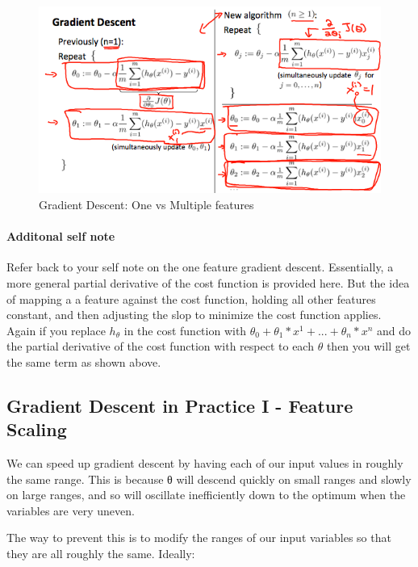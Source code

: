 \documentclass[
]{article}
\begin{document}
\begin{figure}
\centering
\includegraphics{Gradient Descent for Multiple Variables graph 1.png}
\caption{Gradient Descent: One vs Multiple features}
\end{figure}

\hypertarget{additonal-self-note-1}{%
\paragraph{Additonal self note}\label{additonal-self-note-1}}

{ Refer back to your self note on the one feature gradient descent.
Essentially, a more general partial derivative of the cost function is
provided here. But the idea of mapping a a feature against the cost
function, holding all other features constant, and then adjusting the
slop to minimize the cost function applies. Again if you replace
\(h_\theta\) in the cost function with
\(\theta_0 + \theta_1*x^1 + ... + \theta_n*x^n\) and do the partial
derivative of the cost function with respect to each \(\theta\) then you
will get the same term as shown above. }

\hypertarget{gradient-descent-in-practice-i---feature-scaling}{%
\subsection{Gradient Descent in Practice I - Feature
Scaling}\label{gradient-descent-in-practice-i---feature-scaling}}

We can speed up gradient descent by having each of our input values in
roughly the same range. This is because θ will descend quickly on small
ranges and slowly on large ranges, and so will oscillate inefficiently
down to the optimum when the variables are very uneven.

The way to prevent this is to modify the ranges of our input variables
so that they are all roughly the same. Ideally:
\end{document}
